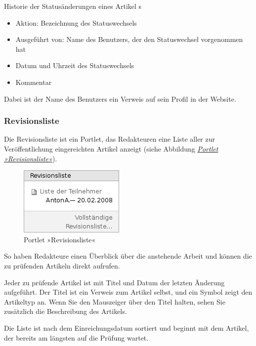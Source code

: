 \documentclass[a4paper,12pt,ngerman]{manual}
\begin{document}
Historie der Statusänderungen eines Artikel     s
\begin{itemize}
\item {} 
Aktion: Bezeichnung des Statuswechsels

\item {} 
Ausgeführt von: Name des Benutzers, der den Statuswechsel vorgenommen hat

\item {} 
Datum und Uhrzeit des Statuswechsels

\item {} 
Kommentar

\end{itemize}

Dabei ist der Name des Benutzers ein Verweis auf sein Profil in der Website.
\hypertarget{sec-revisionsliste}{}

\subsubsection{Revisionsliste}

Die Revisionsliste ist ein Portlet, das Redakteuren eine Liste aller zur
Veröffentlichung eingereichten Artikel anzeigt (siehe
Abbildung \hyperlink{fig-portlet-revlist}{\emph{Portlet »Revisionsliste«}}).
\hypertarget{fig-portlet-revlist}{}\begin{figure}[htbp]
\centering

\includegraphics{portlet-revlist.png}
\caption{Portlet »Revisionsliste«}\end{figure}

So haben Redakteure einen Überblick über die anstehende Arbeit und können die
zu prüfenden Artikeln direkt aufrufen.

Jeder zu prüfende Artikel ist mit Titel und Datum der letzten Änderung
aufgeführt. Der Titel ist ein Verweis zum Artikel selbst, und ein
Symbol zeigt den Artikeltyp an. Wenn Sie den Mauszeiger über den Titel
halten, sehen Sie zusätzlich die Beschreibung des Artikels.

Die Liste ist nach dem Einreichungsdatum sortiert und beginnt mit dem
Artikel, der bereits am längsten auf die Prüfung wartet.
\hypertarget{sec-batch-publishing}{}
\end{document}
